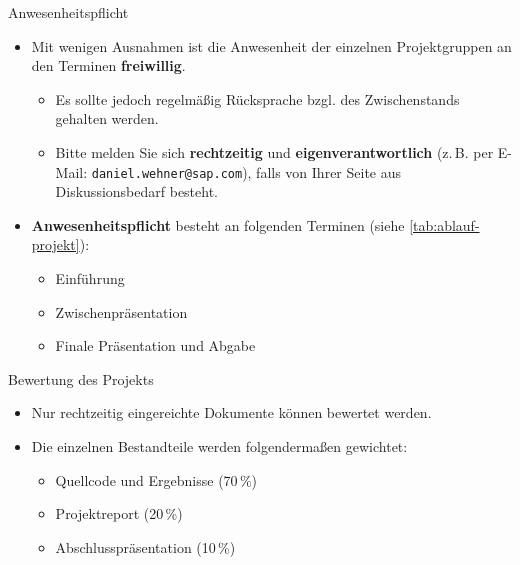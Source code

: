 \begin{dwHeaderFrame}{Anwesenheitspflicht}
	\begin{itemize}
		\item Mit wenigen Ausnahmen ist die Anwesenheit der einzelnen Projektgruppen an den Terminen \textbf{freiwillig}.
		\begin{itemize}
			\item Es sollte jedoch regelmäßig Rücksprache bzgl. des Zwischenstands gehalten werden.
			\item Bitte melden Sie sich \textbf{rechtzeitig} und \textbf{eigenverantwortlich} (z.\,B. per E-Mail: \texttt{daniel.wehner@sap.com}), falls von Ihrer Seite aus Diskussionsbedarf besteht.
		\end{itemize}
		\item \textbf{Anwesenheitspflicht} besteht an folgenden Terminen (siehe \cref{tab:ablauf-projekt}):
		\begin{itemize}
			\item Einführung
			\item Zwischenpräsentation
			\item Finale Präsentation und Abgabe
		\end{itemize}
	\end{itemize}
\end{dwHeaderFrame}


\begin{dwHeaderFrame}{Bewertung des Projekts}
	\begin{itemize}
		\item Nur rechtzeitig eingereichte Dokumente können bewertet werden.
		\item Die einzelnen Bestandteile werden folgendermaßen gewichtet:
		\begin{itemize}
			\item Quellcode und Ergebnisse (70\,\%)
			\item Projektreport (20\,\%)
			\item Abschlusspräsentation (10\,\%)
		\end{itemize}
	\end{itemize}

\end{dwHeaderFrame}


